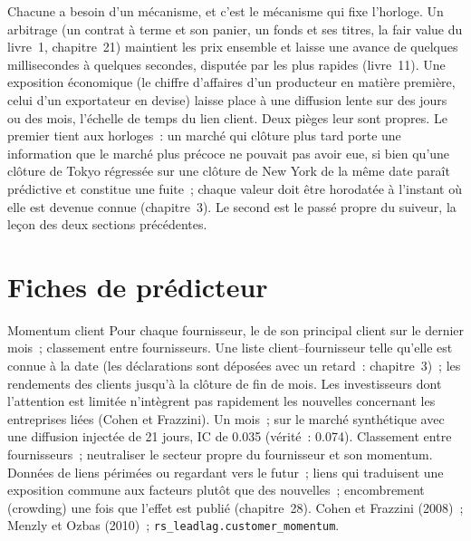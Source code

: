 Chacune a besoin d'un mécanisme, et c'est le mécanisme qui fixe l'horloge. Un arbitrage (un contrat à terme et son panier, un fonds et ses titres, la
fair value du livre~1, chapitre~21) maintient les prix ensemble et laisse une avance de quelques millisecondes à quelques secondes, disputée par les plus rapides (livre~11). Une exposition économique (le chiffre d'affaires d'un producteur en matière première, celui d'un exportateur en devise) laisse place à
une diffusion lente sur des jours ou des mois, l'échelle de temps du lien client. Deux pièges leur sont propres. Le premier tient aux horloges~: un
marché qui clôture plus tard porte une information que le marché plus précoce ne pouvait pas avoir eue, si bien qu'une clôture de Tokyo régressée sur une clôture de New York de
la même date paraît prédictive et constitue une fuite~; chaque valeur doit être horodatée à l'instant où elle est devenue connue (chapitre~3). Le second est
le passé propre du suiveur, la leçon des deux sections précédentes.

\section{Fiches de prédicteur}

\begin{predictorcard}{Momentum client}\label{pred:rs:cross-sectional-and-cross-asset-features:customer}
 Pour chaque fournisseur, le  de son principal client sur le dernier mois~; classement entre fournisseurs.
 Une liste client--fournisseur telle qu'elle est connue à la date (les déclarations sont déposées avec un retard~: chapitre~3)~; les
rendements des clients jusqu'à la clôture de fin de mois.
 Les investisseurs dont l'attention est limitée n'intègrent pas rapidement les nouvelles concernant les entreprises liées (Cohen et Frazzini).
 Un mois~; sur le marché synthétique avec une diffusion injectée de 21 jours, IC de 0.035 (vérité~: 0.074).
 Classement entre fournisseurs~; neutraliser le secteur propre du fournisseur et son momentum.
 Données de liens périmées ou regardant vers le futur~; liens qui traduisent une exposition commune aux facteurs plutôt que des nouvelles~; encombrement (crowding) une fois que
l'effet est publié (chapitre~28).
 Cohen et Frazzini (2008)~; Menzly et Ozbas (2010)~; \texttt{rs\_leadlag.customer\_momentum}.
\end{predictorcard}

